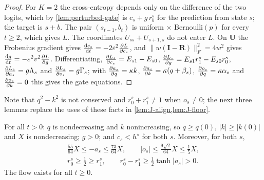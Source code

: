 \begin{proof}
For $K=2$ the cross-entropy depends only on the difference of the two logits, which by \cref{lem:perturbed-gate} is $c_s+g\,r^s_b$ for the
prediction from state $s$; the target is $s+b$. The pair $(s_{t-1},b_t)$ is uniform $\times$ Bernoulli$(p)$ for every $t\ge2$, which gives $L$.
The coordinates $U_{ss}+U_{s+1,s}$ do not enter $L$. On $\mathbf U$ the Frobenius gradient gives $\ddt{c_s}=-2\initscale^2\pd{L}{c_s}$, and
$\|w(\mathbf I-\mathbf R)\|_F^2=4w^2$ gives $\ddt{g}=-\initscale^2v^2\pd{L}{g}$. Differentiating, $\pd{L_s}{c_s}=E_{s1}-E_{s0}$,
$\pd{L_s}{g}=E_{s1}r^s_1-E_{s0}r^s_0$, $\pd{L_s}{a_s}=g\Lambda_s$ and $\pd{L_s}{o_s}=g\Gamma_s$; with $\pd{a_s}{q}=\kappa k$, $\pd{a_s}{k}=\kappa(q+\beta_s)$,
$\pd{o_s}{q}=\kappa\alpha_s$ and $\pd{o_s}{k}=0$ this gives the gate equations.
\end{proof}

Note that $q^2-k^2$ is not conserved and $r^s_0+r^s_1\ne1$ when $o_s\ne0$; the next three lemmas replace the uses of these facts in
\cref{lem:J-align,lem:J-floor}.

\begin{lemma}
\label{lem:perturbed-invariant}
For all $t>0$: $q$ is nondecreasing and $k$ nonincreasing, so $q\ge q(0)$, $|k|\ge|k(0)|$ and $X$ is nondecreasing; $g>0$; and $c_s<h^\star$
for both $s$. Moreover, for both $s$,
\begin{equation}
 \begin{gathered}
 \tfrac{55}{64}X\le-a_s\le\tfrac{73}{64}X,\qquad |o_s|\le\tfrac{9\sqrt2}{64}X\le\tfrac15X,\\
 r^s_0\ge\tfrac12\ge r^s_1,\qquad r^s_0-r^s_1\ge\tfrac12\tanh|a_s|>0.
 \end{gathered}
 \label{eq:perturbed-gate-bounds}
\end{equation}
The flow exists for all $t\ge0$.
\end{lemma}

